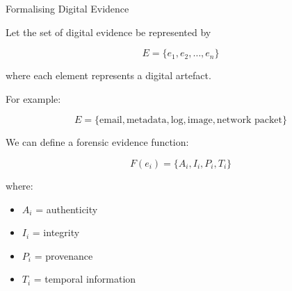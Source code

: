 \documentclass[aspectratio=169,11pt]{beamer}
\begin{document}
	
	\begin{frame}{Formalising Digital Evidence}
		
		Let the set of digital evidence be represented by
		
		\[
		E = \{e_1,e_2,\ldots,e_n\}
		\]
		
		where each element represents a digital artefact.
		
		For example:
		
		\[
		E =
		\{
		\text{email},
		\text{metadata},
		\text{log},
		\text{image},
		\text{network packet}
		\}
		\]
		
		\vspace{0.4cm}
		
		We can define a forensic evidence function:
		
		\[
		F(e_i)=
		\{
		A_i,I_i,P_i,T_i
		\}
		\]
		
		where:
		
		\begin{itemize}
			\item $A_i$ = authenticity
			\item $I_i$ = integrity
			\item $P_i$ = provenance
			\item $T_i$ = temporal information
		\end{itemize}
		
	\end{frame}
	
	
\end{document}
